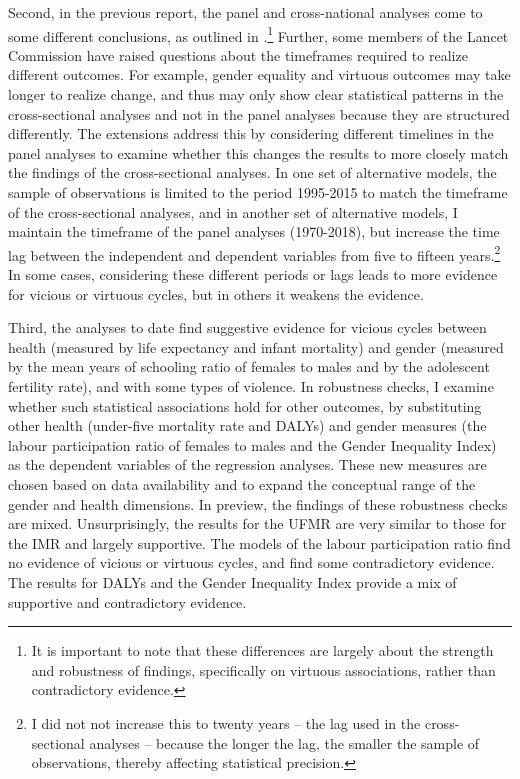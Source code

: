 \documentclass[12pt]{article}
\begin{document}
Second, in the previous report, the panel and cross-national analyses come to some different conclusions, as outlined in .\footnote{It is important to note that these differences are largely about the strength and robustness of findings, specifically on virtuous associations, rather than contradictory evidence.}
Further, some members of the Lancet Commission have raised questions about the timeframes required to realize different outcomes. For example, gender equality and virtuous outcomes may take longer to realize change, and thus may only show clear statistical patterns in the cross-sectional analyses and not in the panel analyses because they are structured differently. The extensions address this by considering different timelines in the panel analyses to examine whether this changes the results to more closely match the findings of the cross-sectional analyses. In one set of alternative models, the sample of observations is limited to the period 1995-2015 to match the timeframe of the cross-sectional analyses, and in another set of alternative models, I maintain the timeframe of the panel analyses (1970-2018), but increase the time lag between the independent and dependent variables from five to fifteen years.\footnote{I did not not increase this to twenty years -- the lag used in the cross-sectional analyses -- because the longer the lag, the smaller the sample of observations, thereby affecting statistical precision.} In some cases, considering these different periods or lags leads to more evidence for vicious or virtuous cycles, but in others it weakens the evidence.


Third, the analyses to date find suggestive evidence for vicious cycles between health (measured by life expectancy and infant mortality) and gender (measured by the mean years of schooling ratio of females to males and by the adolescent fertility rate), and with some types of violence. In robustness checks, I examine whether such statistical associations hold for other outcomes, by substituting other health (under-five mortality rate and DALYs) and gender measures (the labour participation ratio of females to males and the Gender Inequality Index) as the dependent variables of the regression analyses. These new measures are chosen based on data availability and to expand the conceptual range of the gender and health dimensions. In preview, the findings of these robustness checks are mixed. Unsurprisingly, the results for the UFMR are very similar to those for the IMR and largely supportive. The models of the labour participation ratio find no evidence of vicious or virtuous cycles, and find some contradictory evidence. The results for DALYs and the Gender Inequality Index provide a mix of supportive and contradictory evidence.
\end{document}
